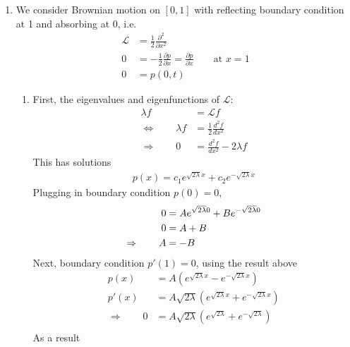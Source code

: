 \documentclass[12pt]{article}
\theoremstyle{plain}
\theoremstyle{definition}
\theoremstyle{remark}
\begin{document}
\begin{enumerate}
  \item %
    We consider Brownian motion on $[0,1]$ with reflecting boundary
    condition at 1 and absorbing at 0, i.e.
    \begin{align*}
      \mathscr{L} &= \frac{1}{2} \frac{\partial^2}{\partial x^2}\\
      0
      &= -\frac{1}{2} \frac{\partial p}{\partial x}
      = \frac{\partial p}{\partial x}
      \qquad \text{at $x=1$}\\
      0 &= p(0,t)
    \end{align*}

    \begin{enumerate}
      \item %
        First, the eigenvalues and eigenfunctions of $\mathscr{L}$:
        \begin{align*}
          \lambda f &= \mathscr{L} f\\
          \Leftrightarrow \qquad
          \lambda f &= \frac{1}{2} \frac{d^2 f}{d x^2}\\
          \Rightarrow \qquad
          0 &= \frac{d^2 f}{d x^2} -2\lambda f
        \end{align*}
        This has solutions
        \begin{align*}
          p(x) = c_1 e^{\sqrt{2\lambda} x} + c_2 e^{-\sqrt{2\lambda} x}
        \end{align*}
        Plugging in boundary condition $p(0)=0$,
        \begin{align}
          0 &= A e^{\sqrt{2\lambda} 0} + B e^{-\sqrt{2\lambda} 0} \notag\\
          0 &= A + B \notag \\
          \Rightarrow \qquad
          A &= -B \label{q3a.1}
        \end{align}
        Next, boundary condition $p'(1) = 0$, using the result above
        \begin{align*}
          p(x) &= A (e^{\sqrt{2\lambda} x} - e^{-\sqrt{2\lambda} x}) \\
          p'(x) &= A \sqrt{2\lambda} (e^{\sqrt{2\lambda} x} +  e^{-\sqrt{2\lambda} x}) \\
          \Rightarrow\qquad
          0 &=
          A \sqrt{2\lambda} (e^{\sqrt{2\lambda}} +  e^{-\sqrt{2\lambda}}) \\
        \end{align*}
        As a result
        \begin{align*}
        \end{align*}
    \end{enumerate}


\end{enumerate}
\end{document}
